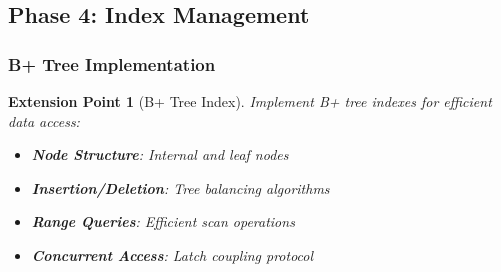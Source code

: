 \documentclass[12pt,a4paper]{article}
\newtheorem{extension}{Extension Point}[section]
\begin{document}
    \subsection{Phase 4: Index Management}

    \subsubsection{B+ Tree Implementation}

    \begin{extension}[B+ Tree Index]
        Implement B+ tree indexes for efficient data access:

        \begin{itemize}
            \item \textbf{Node Structure}: Internal and leaf nodes
            \item \textbf{Insertion/Deletion}: Tree balancing algorithms
            \item \textbf{Range Queries}: Efficient scan operations
            \item \textbf{Concurrent Access}: Latch coupling protocol
        \end{itemize}
    \end{extension}
\end{document}
